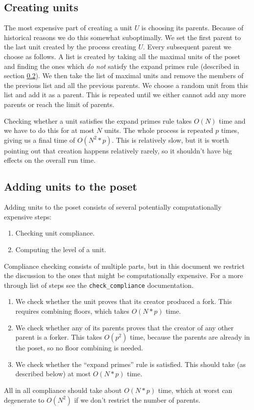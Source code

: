 \documentclass[a4paper,10pt]{article}
\begin{document}
		\subsection{Creating units}
			The most expensive part of creating a unit $U$ is choosing its parents. Because of historical reasons we do this somewhat suboptimally.
			We set the first parent to the last unit created by the process creating $U$. Every subsequent parent we choose as follows.
			A list is created by taking all the maximal units of the poset and finding the ones which \emph{do not} satisfy the expand primes rule (described in section \ref{sec:adding}).
			We then take the list of maximal units and remove the members of the previous list and all the previous parents.
			We choose a random unit from this list and add it as a parent. This is repeated until we either cannot add any more parents or reach the limit of parents.


			Checking whether a unit satisfies the expand primes rule takes $O(N)$ time and we have to do this for at most $N$ units.
			The whole process is repeated $p$ times, giving us a final time of $O(N^2*p)$.
			This is relatively slow, but it is worth pointing out that creation happens relatively rarely, so it shouldn't have big effects on the overall run time.
		\subsection{Adding units to the poset}
		 \label{sec:adding}
		 Adding units to the poset consists of several potentially computationally expensive steps:
			\begin{enumerate}
				\item Checking unit compliance.
				\item Computing the level of a unit.
			\end{enumerate}

			Compliance checking consists of multiple parts, but in this document we restrict the discussion to the ones that might be computationally expensive.
			For a more through list of steps see the \lstinline{check_compliance} documentation.
			\begin{enumerate}
				\item We check whether the unit proves that its creator produced a fork. This requires combining floors, which takes $O(N*p)$ time.
				\item We check whether any of its parents proves that the creator of any other parent is a forker. This takes $O(p^2)$ time,
					because the parents are already in the poset, so no floor combining is needed.
				\item We check whether the ``expand primes'' rule is satisfied. This should take (as described below) at most $O(N*p)$ time.
			\end{enumerate}
			All in all compliance should take about $O(N*p)$ time, which at worst can degenerate to $O(N^2)$ if we don't restrict the number of parents.
\end{document}
